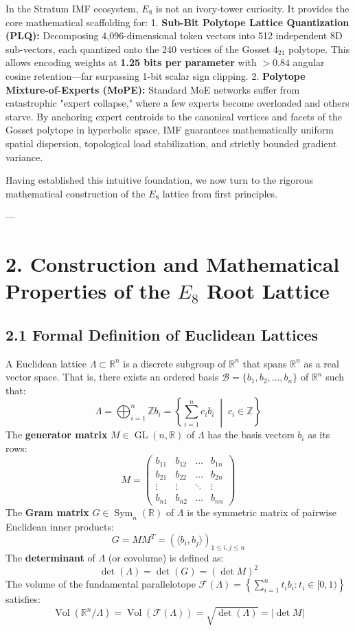 \documentclass[11pt,twoside,openright]{amsbook}
\begin{document}
In the Stratum IMF ecosystem, $E_8$ is not an ivory-tower curiosity. It provides the core mathematical scaffolding for:
1. \textbf{Sub-Bit Polytope Lattice Quantization (PLQ):} Decomposing 4,096-dimensional token vectors into 512 independent 8D sub-vectors, each quantized onto the 240 vertices of the Gosset $4_{21}$ polytope. This allows encoding weights at \textbf{1.25 bits per parameter} with $>0.84$ angular cosine retention—far surpassing 1-bit scalar sign clipping.
2. \textbf{Polytope Mixture-of-Experts (MoPE):} Standard MoE networks suffer from catastrophic "expert collapse," where a few experts become overloaded and others starve. By anchoring expert centroids to the canonical vertices and facets of the Gosset polytope in hyperbolic space, IMF guarantees mathematically uniform spatial dispersion, topological load stabilization, and strictly bounded gradient variance.

Having established this intuitive foundation, we now turn to the rigorous mathematical construction of the $E_8$ lattice from first principles.

---

\section{2. Construction and Mathematical Properties of the $E_8$ Root Lattice}

\subsection{2.1 Formal Definition of Euclidean Lattices}

A Euclidean lattice $\Lambda \subset \mathbb{R}^n$ is a discrete subgroup of $\mathbb{R}^n$ that spans $\mathbb{R}^n$ as a real vector space. That is, there exists an ordered basis $\mathcal{B} = \{b_1, b_2, \dots, b_n\}$ of $\mathbb{R}^n$ such that:
$$\Lambda = \bigoplus_{i=1}^n \mathbb{Z} b_i = \left\{ \sum_{i=1}^n c_i b_i \;\middle|\; c_i \in \mathbb{Z} \right\}$$
The \textbf{generator matrix} $M \in \operatorname{GL}(n, \mathbb{R})$ of $\Lambda$ has the basis vectors $b_i$ as its rows:
$$M = \begin{pmatrix} b_{11} & b_{12} & \dots & b_{1n} \\ b_{21} & b_{22} & \dots & b_{2n} \\ \vdots & \vdots & \ddots & \vdots \\ b_{n1} & b_{n2} & \dots & b_{nn} \end{pmatrix}$$
The \textbf{Gram matrix} $G \in \operatorname{Sym}_n(\mathbb{R})$ of $\Lambda$ is the symmetric matrix of pairwise Euclidean inner products:
$$G = M M^T = \left( \langle b_i, b_j \rangle \right)_{1 \le i, j \le n}$$
The \textbf{determinant} of $\Lambda$ (or covolume) is defined as:
$$\det(\Lambda) = \det(G) = (\det M)^2$$
The volume of the fundamental parallelotope $\mathcal{F}(\Lambda) = \left\{ \sum_{i=1}^n t_i b_i : t_i \in [0, 1) \right\}$ satisfies:
$$\operatorname{Vol}(\mathbb{R}^n / \Lambda) = \operatorname{Vol}(\mathcal{F}(\Lambda)) = \sqrt{\det(\Lambda)} = |\det M|$$
\end{document}
